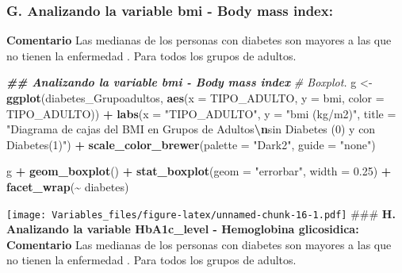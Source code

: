 \documentclass[
]{article}
\newenvironment{Shaded}{\begin{snugshade}}{\end{snugshade}}
\newcommand{\AttributeTok}[1]{\textcolor[rgb]{0.13,0.29,0.53}{#1}}
\newcommand{\CommentTok}[1]{\textcolor[rgb]{0.56,0.35,0.01}{\textit{#1}}}
\newcommand{\DocumentationTok}[1]{\textcolor[rgb]{0.56,0.35,0.01}{\textbf{\textit{#1}}}}
\newcommand{\FloatTok}[1]{\textcolor[rgb]{0.00,0.00,0.81}{#1}}
\newcommand{\FunctionTok}[1]{\textcolor[rgb]{0.13,0.29,0.53}{\textbf{#1}}}
\newcommand{\NormalTok}[1]{#1}
\newcommand{\OtherTok}[1]{\textcolor[rgb]{0.56,0.35,0.01}{#1}}
\newcommand{\SpecialCharTok}[1]{\textcolor[rgb]{0.81,0.36,0.00}{\textbf{#1}}}
\newcommand{\StringTok}[1]{\textcolor[rgb]{0.31,0.60,0.02}{#1}}
\begin{document}
\hypertarget{g.-analizando-la-variable-bmi---body-mass-index}{%
\subsubsection{\texorpdfstring{\textbf{G. Analizando la variable bmi -
Body mass
index:}}{G. Analizando la variable bmi - Body mass index:}}\label{g.-analizando-la-variable-bmi---body-mass-index}}

\textbf{Comentario} Las medianas de los personas con diabetes son
mayores a las que no tienen la enfermedad . Para todos los grupos de
adultos.

\begin{Shaded}
\begin{Highlighting}[]
\DocumentationTok{\#\# Analizando la variable  bmi  {-} Body mass index }
\CommentTok{\# Boxplot.}
\NormalTok{g }\OtherTok{\textless{}{-}}
  \FunctionTok{ggplot}\NormalTok{(diabetes\_Grupoadultos, }\FunctionTok{aes}\NormalTok{(}\AttributeTok{x =}\NormalTok{ TIPO\_ADULTO, }\AttributeTok{y =}\NormalTok{ bmi,}
                   \AttributeTok{color =}\NormalTok{ TIPO\_ADULTO)) }\SpecialCharTok{+}
    \FunctionTok{labs}\NormalTok{(}\AttributeTok{x =} \StringTok{"TIPO\_ADULTO"}\NormalTok{, }\AttributeTok{y =} \StringTok{"bmi (kg/m2)"}\NormalTok{, }\AttributeTok{title =} \StringTok{"Diagrama de cajas del BMI en Grupos de Adultos}\SpecialCharTok{\textbackslash{}n}\StringTok{sin Diabetes (0) y con Diabetes(1)"}\NormalTok{) }\SpecialCharTok{+}
    \FunctionTok{scale\_color\_brewer}\NormalTok{(}\AttributeTok{palette =} \StringTok{"Dark2"}\NormalTok{, }\AttributeTok{guide =} \StringTok{"none"}\NormalTok{)}

\NormalTok{g }\SpecialCharTok{+} \FunctionTok{geom\_boxplot}\NormalTok{() }\SpecialCharTok{+}    \FunctionTok{stat\_boxplot}\NormalTok{(}\AttributeTok{geom =} \StringTok{"errorbar"}\NormalTok{,}
               \AttributeTok{width =} \FloatTok{0.25}\NormalTok{) }\SpecialCharTok{+} \FunctionTok{facet\_wrap}\NormalTok{(}\SpecialCharTok{\textasciitilde{}}\NormalTok{ diabetes)}
\end{Highlighting}
\end{Shaded}

\texttt{[image: Variables\_files/figure-latex/unnamed-chunk-16-1.pdf]}
\#\#\# \textbf{H. Analizando la variable HbA1c\_level - Hemoglobina
glicosidica:} \textbf{Comentario} Las medianas de los personas con
diabetes son mayores a las que no tienen la enfermedad . Para todos los
grupos de adultos.
\end{document}
